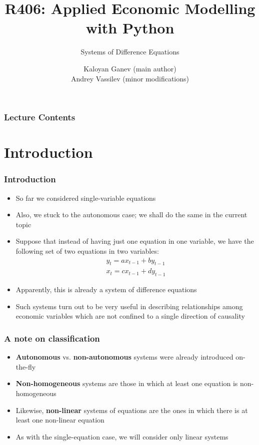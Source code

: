 \documentclass[10pt,usenames,dvipsnames]{beamer}
\title{R406: Applied Economic Modelling with Python}
\subtitle{\textcolor{myred}{Systems of Difference Equations}}
\author[Kaloyan Ganev,  Andrey Vassilev]{Kaloyan Ganev (main author) \\
	Andrey Vassilev (minor modifications)}
\date{}
\theoremstyle{plain}
\theoremstyle{definition}
\begin{document}
\maketitle

\begin{frame}[fragile]
\frametitle{Lecture Contents}
\tableofcontents
\end{frame}

\section{Introduction}
\begin{frame}[fragile]
\frametitle{Introduction}
\begin{itemize}
	\item So far we considered single-variable equations
	\item Also, we stuck to the autonomous case; we shall do the same in the current topic
	\item Suppose that instead of having just one equation in one variable, we have the following set of two equations in two variables:
	\[
		\begin{array}{lcl}
			y_{t} = ax_{t-1} + b y_{t-1}\\
			x_{t} = cx_{t-1} + d y_{t-1}
		\end{array}
	\]
	\item Apparently, this is already a system of difference equations
	\item Such systems turn out to be very useful in describing relationships among economic variables which are not confined to a single direction of causality
\end{itemize}
\end{frame}

\begin{frame}[fragile]
\frametitle{A note on classification}
\begin{itemize}
	\item \textbf{Autonomous} vs. \textbf{non-autonomous} systems were already introduced on-the-fly
	\item \textbf{Non-homogeneous} systems are those in which at least one equation is non-homogeneous
	\item Likewise, \textbf{non-linear} systems of equations are the ones in which there is at least one non-linear equation
	\item As with the single-equation case, we will consider only linear systems
\end{itemize}
\end{frame}
\end{document}
